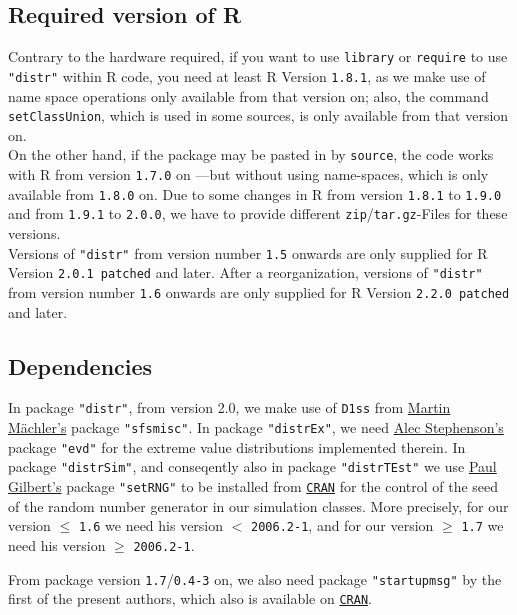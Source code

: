 \documentclass[11pt]{article}
\newcommand{\code}[1]{{\tt #1}}
\newcommand{\pkg}[1]{{\tt "#1"}}
\begin{document}
\subsection{Required version of {\sf R}}
Contrary to the hardware required,
if you want to use \code{library} or \code{require} to use  \pkg{distr} 
within {\sf R} code, you need at least {\sf R} Version {\tt 1.8.1},
as we make use of name space operations only available from that version on;
also, the command \code{setClassUnion}, which is used in some sources, is only
 available from that version on.\\
%
On the other hand, if the package may be pasted in by \code{source}, the code 
works with {\sf R} from
version {\tt 1.7.0} on ---but without using name-spaces, which is only available
 from {\tt 1.8.0} on.
Due to some changes in {\sf R} from version {\tt 1.8.1} to {\tt 1.9.0} and from 
{\tt 1.9.1} to {\tt 2.0.0}, we have to provide different
 {\tt zip}/{\tt tar.gz}-Files for these versions.\\
Versions of \pkg{distr} from version number {\tt 1.5} onwards are only
supplied for {\sf R} Version {\tt 2.0.1 patched} and later.
After a reorganization, versions of \pkg{distr} from version number {\tt 1.6} 
onwards are only supplied for {\sf R} Version {\tt 2.2.0 patched} and later.


\subsection{Dependencies}
In package \pkg{distr}, from version 2.0, we make use of \code{D1ss} from
\href{mailto:maechler@stat.math.ethz.ch}{Martin M\"achler's} package \pkg{sfsmisc}.
In package \pkg{distrEx}, we need 
\href{mailto:alec_stephenson@hotmail.com}{Alec Stephenson's} package \pkg{evd} 
for the extreme  value distributions implemented therein. 
In package \pkg{distrSim}, and conseqently also in package \pkg{distrTEst} we 
use \href{mailto:pgilbert@bank-banque-canada.ca}{Paul Gilbert's}  
package \pkg{setRNG}
to be installed from \href{http://cran.r-project.org/mirrors.html}{\tt CRAN}
for the control of the seed of the random number generator in our simulation 
classes.
More precisely, for our version $\le$ {\tt 1.6}  we need his
 version $<$ {\tt 2006.2-1},
and for our version $\ge$ {\tt 1.7} we need his version $\ge$ {\tt 2006.2-1}.

From package version {\tt 1.7}/{\tt 0.4-3} on, we also need package
 \pkg{startupmsg} by the first of the present authors, which also is available 
 on \href{http://cran.r-project.org/mirrors.html}{\tt CRAN}.
\end{document}
